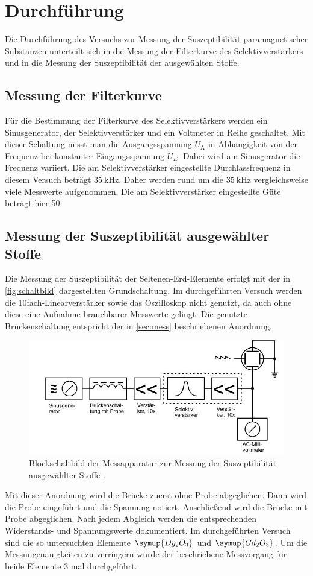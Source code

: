 \section{Durchführung}
\label{sec:Durchführung}
Die Durchführung des Versuchs zur Messung der Suszeptibilität paramagnetischer Substanzen unterteilt sich in die Messung der Filterkurve des Selektivverstärkers und in die Messung der Suszeptibilität der ausgewählten Stoffe.
\subsection{Messung der Filterkurve}
Für die Bestimmung der Filterkurve des Selektivverstärkers werden ein Sinusgenerator, der Selektivverstärker und ein Voltmeter in Reihe geschaltet. Mit dieser Schaltung misst man die Ausgangsspannung $U_\text{A}$ in Abhängigkeit von der Frequenz bei konstanter Eingangsspannung $U_E$. Dabei wird am Sinusgerator die Frequenz variiert. Die am Selektivverstärker eingestellte Durchlassfrequenz in diesem Versuch beträgt $\SI{35}{\kilo\hertz}$. Daher werden rund um die $\SI{35}{\kilo\hertz}$ vergleichsweise viele Messwerte aufgenommen. Die am Selektivverstärker eingestellte Güte beträgt hier 50.
\subsection{Messung der Suszeptibilität ausgewählter Stoffe} 
Die Messung der Suszeptibilität der Seltenen-Erd-Elemente erfolgt mit der in \autoref{fig:schaltbild} dargestellten Grundschaltung. Im durchgeführten Versuch werden die 10fach-Linearverstärker sowie das Oszilloskop nicht genutzt, da auch ohne diese eine Aufnahme brauchbarer Messwerte gelingt. Die genutzte Brückenschaltung entspricht der in \autoref{sec:mess} beschriebenen Anordnung. 
\begin{figure}[H]
    \centering
    \includegraphics[width=\textwidth]{content/schaltbild.jpg}
    \caption{Blockschaltbild der Messapparatur zur Messung der Suszeptibilität
    ausgewählter Stoffe \cite{versuchsanleitung}.}
    \label{fig:schaltbild}
\end{figure}
\noindent Mit dieser Anordnung wird die Brücke zuerst ohne Probe abgeglichen. Dann wird die Probe eingeführt und die Spannung notiert. Anschließend wird die Brücke mit Probe abgeglichen. Nach jedem Abgleich werden die entsprechenden Widerstands- und Spannungswerte dokumentiert. Im durchgeführten Versuch sind die so untersuchten Elemente $\symup{Dy_2O_3}$ und $\symup{Gd_2O_3}$. Um die Messungenauigkeiten zu verringern wurde der beschriebene Messvorgang für beide Elemente 3 mal durchgeführt. 
